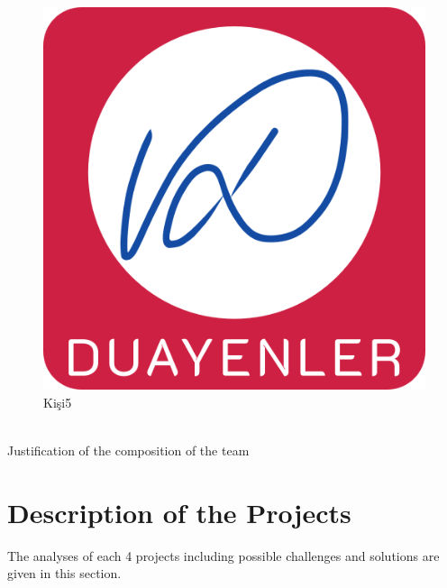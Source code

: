 \begin{minipage}{0.28\textwidth}
\begin{flushleft}

\begin{figure}[H]
\center
\setlength{\unitlength}{\textwidth} 
\includegraphics[width=0.7\unitlength]{images/logo1}
\caption{\label{fig:kisi5}Kişi5 }
\end{figure}


\end{flushleft}
\end{minipage}
\begin{minipage}{0.8\textwidth}
\begin{flushright} 

\blindtext

\end{flushright}
\end{minipage}\\[0.8cm]


Justification of the composition of the team

\section{Description of the Projects}
The analyses of each 4 projects including possible challenges and solutions are given in this section.

